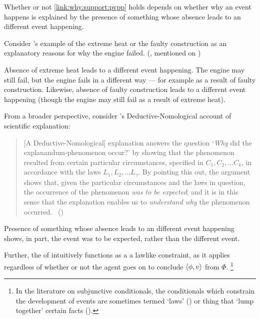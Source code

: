 \begin{note}
  Whether or not \autoref{link:why:support:pvpp} holds depends on whether why an event happens is explained by the presence of something whose absence leads to an different event happening.

  Consider \citeauthor{Hieronymi:2011aa}'s example of the extreme heat or the faulty construction as an explanatory reasons for why the engine failed.
  (\citeyear[409]{Hieronymi:2011aa}, mentioned on )

  Absence of extreme heat leads to a different event happening.
  The engine may still fail, but the engine fails in a different way --- for example as a result of faulty construction.
  Likewise, absence of faulty construction leads to a different event happening (though the engine may still fail as a result of extreme heat).
\end{note}

\begin{note}
  From a broader perspective, consider \citeauthor{Hempel:1965aa}'s Deductive-Nomological account of scientific explanation:

  \begin{quote}
    [A Deductive-Nomological] explanation answers the question
    `\emph{Why} did the explanandum-phenomenon occur?'
    by showing that the phenomenon resulted from certain particular circumstances, specified in \(C_{1}, C_{2}, \dots C_{k}\), in accordance with the laws \(L_{1}, L_{2}, \dots L_{\gamma}\).
    By pointing this out, the argument shows that, given the particular circumstances and the laws in question, the occurrence of the phenomenon \emph{was to be expected}; and it is in this sense that the explanation enables us to \emph{understand why} the phenomenon occurred.%
    \mbox{ }\hfill\mbox{(\citeyear[337]{Hempel:1965aa})}
  \end{quote}
  Presence of something whose absence leads to an different event happening shows, in part, the event was to be expected, rather than the different event.

  Further, the \itc{} of \qWhyV{} intuitively functions as a a lawlike constraint, as it applies regardless of whether or not the agent goes on to conclude \(\langle \phi, v \rangle\) from \(\Phi\).%
  \footnote{
    \nocite{Tichy:1976tp}%
    In the literature on subjunctive conditionals, the conditionals which constrain the development of events are sometimes termed `laws' (\cite{Chisholm:1955aa,Lewis:1979vm,Veltman:2005tj}) or thing that `lump together' certain facts (\cite{Kratzer:1981aa,Kratzer:1989aa}).
  }
\end{note}

